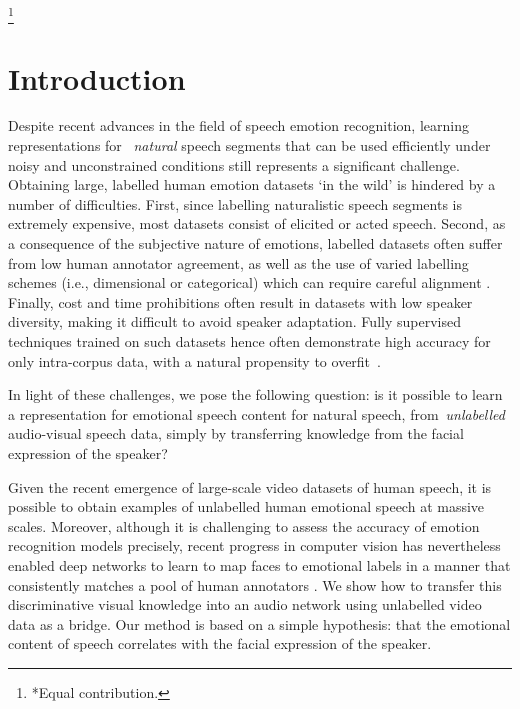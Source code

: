 \documentclass[sigconf]{acmart}
\newcommand\blfootnote[1]{\begingroup
  \renewcommand\thefootnote{}\footnote{#1}\addtocounter{footnote}{-1}\endgroup
}
\begin{document}
 
\maketitle

\blfootnote{*Equal contribution.}

\section{Introduction}

Despite recent advances in the field of speech emotion recognition, learning representations for ~\textit{natural} speech segments that can be used efficiently under noisy and unconstrained conditions still represents a significant challenge. Obtaining large, labelled human emotion datasets `in the wild' is hindered by a number of difficulties. First, since labelling naturalistic speech segments is extremely expensive, most datasets consist of elicited or acted speech. Second, as a consequence of the subjective nature of emotions, labelled datasets often suffer from low human annotator agreement, as well as the use of varied labelling schemes (i.e., dimensional or categorical) which can require careful alignment \cite{mariooryad2013analysis}. Finally, cost and time prohibitions often result in datasets with low speaker diversity, making it difficult to avoid speaker adaptation. Fully supervised techniques trained on such datasets hence often demonstrate high accuracy for only intra-corpus data, with a natural propensity to overfit~\cite{transfer2018Latif}.

In light of these challenges, we pose the following question: is it possible to learn a representation for emotional speech content for natural speech, from~\textit{unlabelled} audio-visual speech data, simply by transferring knowledge from the facial expression of the speaker? 

Given the recent emergence of large-scale  video datasets of human speech, it is possible to obtain examples of unlabelled human emotional speech at massive scales. Moreover, although it is challenging to assess the accuracy of emotion recognition models precisely, recent progress in computer vision has nevertheless enabled deep networks to learn to map faces to emotional labels in a manner that consistently matches a pool of human annotators \cite{Albanie16}. We show how to transfer this discriminative visual knowledge into an audio network using unlabelled video data as a bridge.  Our method is based on a simple hypothesis: that the emotional content of speech correlates with the facial expression of the speaker.
\end{document}
